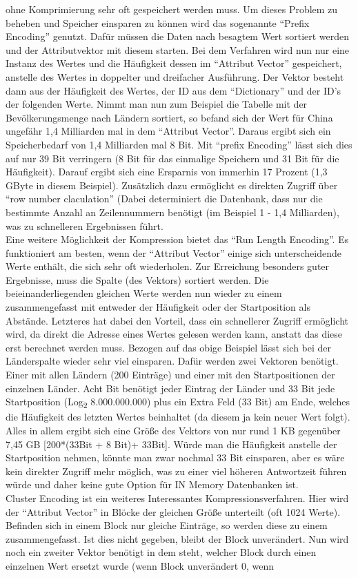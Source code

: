 \documentclass[a4paper, 12pt]{scrartcl}
\begin{document}
ohne Komprimierung sehr oft gespeichert werden muss. Um dieses Problem zu beheben und Speicher einsparen zu können wird das sogenannte "`Prefix Encoding"' genutzt. Dafür müssen die Daten nach besagtem Wert sortiert werden und der Attributvektor mit diesem starten. Bei dem Verfahren wird nun nur eine Instanz des Wertes und die Häufigkeit dessen im "`Attribut Vector"' gespeichert, anstelle des Wertes in doppelter und dreifacher Ausführung. Der Vektor besteht dann aus der Häufigkeit des Wertes, der ID aus dem "`Dictionary"' und der ID's der folgenden Werte. Nimmt man nun zum Beispiel die Tabelle mit der Bevölkerungsmenge nach Ländern sortiert, so befand sich der Wert für China ungefähr 1,4 Milliarden mal in dem "`Attribut Vector"'. Daraus ergibt sich ein Speicherbedarf von 1,4 Milliarden mal 8 Bit. Mit "`prefix Encoding"' lässt sich dies auf nur 39 Bit verringern (8 Bit für das einmalige Speichern und 31 Bit für die Häufigkeit). Darauf ergibt sich eine Ersparnis von immerhin 17 Prozent (1,3 GByte in diesem Beispiel). Zusätzlich dazu ermöglicht es direkten Zugriff über "`row number claculation"' (Dabei determiniert die Datenbank, dass nur die bestimmte Anzahl an Zeilennummern benötigt (im Beispiel 1 - 1,4 Milliarden), was zu schnelleren Ergebnissen führt. \\ Eine weitere Möglichkeit der Kompression bietet das "`Run Length Encoding"'. Es funktioniert am besten, wenn der "`Attribut Vector"' einige sich unterscheidende Werte enthält, die sich sehr oft wiederholen. Zur Erreichung besonders guter Ergebnisse, muss die Spalte (des Vektors) sortiert werden. Die beieinanderliegenden gleichen Werte werden nun wieder zu einem zusammengefasst mit entweder der Häufigkeit oder der Startposition als Abstände. Letzteres hat dabei den Vorteil, dass ein schnellerer Zugriff ermöglicht wird, da direkt die Adresse eines Wertes gelesen werden kann, anstatt das diese erst berechnet werden muss. Bezogen auf das obige Beispiel lässt sich bei der Länderspalte wieder sehr viel einsparen. Dafür werden zwei Vektoren benötigt. Einer mit allen Ländern (200 Einträge) und einer mit den Startpositionen der einzelnen Länder. Acht Bit benötigt jeder Eintrag der Länder und 33 Bit jede Startposition (Log\textsubscript{2} 8.000.000.000) plus ein Extra Feld (33 Bit) am Ende, welches die Häufigkeit des letzten Wertes beinhaltet (da diesem ja kein neuer Wert folgt). Alles in allem ergibt sich eine Größe des Vektors von nur rund 1 KB gegenüber 7,45 GB [200*(33Bit + 8 Bit)+ 33Bit]. Würde man die Häufigkeit anstelle der Startposition nehmen, könnte man zwar nochmal 33 Bit einsparen, aber es wäre kein direkter Zugriff mehr möglich, was zu einer viel höheren Antwortzeit führen würde und daher keine gute Option für IN Memory Datenbanken ist.\\ Cluster Encoding ist ein weiteres Interessantes Kompressionsverfahren. Hier wird der "`Attribut Vector"' in Blöcke der gleichen Größe unterteilt (oft 1024 Werte). Befinden sich in einem Block nur gleiche Einträge, so werden diese zu einem zusammengefasst. Ist dies nicht gegeben, bleibt der Block unverändert. Nun wird noch ein zweiter Vektor benötigt in dem steht, welcher Block durch einen einzelnen Wert ersetzt wurde (wenn Block unverändert 0, wenn 
\end{document}
